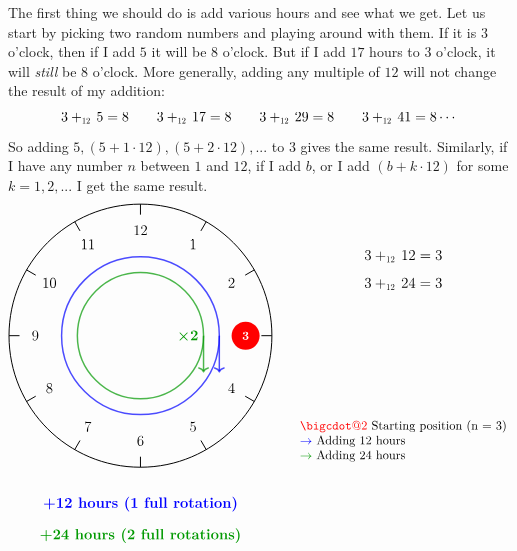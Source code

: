 \documentclass{article}
\makeatletter
\newcommand\scalemath[2]{\scalebox{#1}{\mbox{\ensuremath{\displaystyle #2}}}}
\newcommand{\Plus}[1]{+_{\scalemath{0.6}{#1}}\,}
\newcommand*\bigcdot{\mathpalette\bigcdot@{2}}
\newcommand*\bigcdot@[2]{\mathbin{\vcenter{\hbox{\scalebox{#2}{$\m@th#1\bullet$}}}}}
\makeatother
\begin{document}
The first thing we should do is add various hours and see what we get. Let us start by picking two random
numbers and playing around with them. If it is $3$ o'clock, then if I add $5$ it will be $8$ o'clock. But if I
add $17$ hours to $3$ o'clock, it will \emph{still} be $8$ o'clock. More generally, adding any multiple of
$12$ will not change the result of my addition:
\[
  3\Plus{12} 5 = 8\quad\quad 3\Plus{12}17 = 8 \quad\quad 3\Plus{12}29=8\quad\quad 3\Plus{12}41 = 8\cdots
\]
So adding $5,(5+1\cdot 12), (5+2\cdot 12), ...$ to $3$ gives the same result. Similarly, if I have any number
$n$ between $1$ and $12$, if I add $b$, or I add $(b + k\cdot 12)$ for some $k = 1,2,...$ I get the same
result.
\[
\begin{tikzpicture}[scale=1.5]
  \draw[thick] (0,0) circle (2.5);

  \foreach \hour in {1,2,...,12} {
    \draw[thick] ({90-30*\hour}:2.3) -- ({90-30*\hour}:2.5);
    \node at ({90-30*\hour}:2.0) {\large \hour};
  }

  \node[circle, fill=red, text=white, minimum size=0.8cm] at ({90-30*3}:2.0) {\textbf{3}};

  \draw[->, very thick, blue, opacity=0.7] (0,0) circle (1.5);
  \draw[->, very thick, blue, opacity=0.7] (1.5,0) -- (1.5,-0.7);
  \node[blue, font=\large\bfseries] at (0,-3.2) {+12 hours (1 full rotation)};

  \draw[->, very thick, dkgreen, opacity=0.7] (0,0) circle (1.2);
  \draw[->, very thick, dkgreen, opacity=0.7] (1.2,0) -- (1.2,-0.7);
  \node[dkgreen, font=\large\bfseries] at (0.9,0) {\textbf{×2}};
  \node[dkgreen, font=\large\bfseries] at (0,-3.8) {+24 hours (2 full rotations)};

  \node[align=center, font=\large] at (5,1) {
    $3 \Plus{12} 12 = 3 $ \\[0.3cm]
    $3 \Plus{12} 24 = 3 $ \\[0.3cm]
  };

  \node[align=left, font=\normalsize] at (5,-2) {
    \textcolor{red}{$\bigcdot$} Starting position (n = 3) \\
    \textcolor{blue}{$\to$} Adding 12 hours \\
    \textcolor{dkgreen}{$\to$} Adding 24 hours
  };

\end{tikzpicture}
\]
\end{document}
